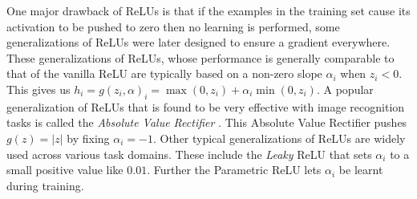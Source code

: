 \documentclass[14pt]{extarticle}
\numberwithin{equation}{section}
\begin{document}
	One major drawback of ReLUs is that if the examples in the training set cause its activation to be pushed to zero then no learning is performed, some generalizations of ReLUs were later designed to ensure a gradient everywhere. These generalizations of ReLUs, whose performance is generally comparable to that of the vanilla ReLU are typically based on a non-zero slope $\alpha_i$ when $z_i < 0$. This gives us  $h_i = g(z_i,\alpha)_i = \max(0,z_i) + \alpha_i \min(0,z_i)$. A popular generalization of ReLUs that is found to be very effective with image recognition tasks is called the \textit{Absolute Value Rectifier} \cite{jarrett2009best}. This Absolute Value Rectifier pushes $g(z) = |z| $ by fixing $\alpha_i = -1$. Other typical generalizations of ReLUs are widely used across various task domains. These include the \textit{Leaky} ReLU that sets $\alpha_i$ to a small positive value like $0.01$\cite{maas2013rectifier}. Further the Parametric ReLU lets $\alpha_i$ be learnt during training\cite{he2015delving}.
\end{document}
